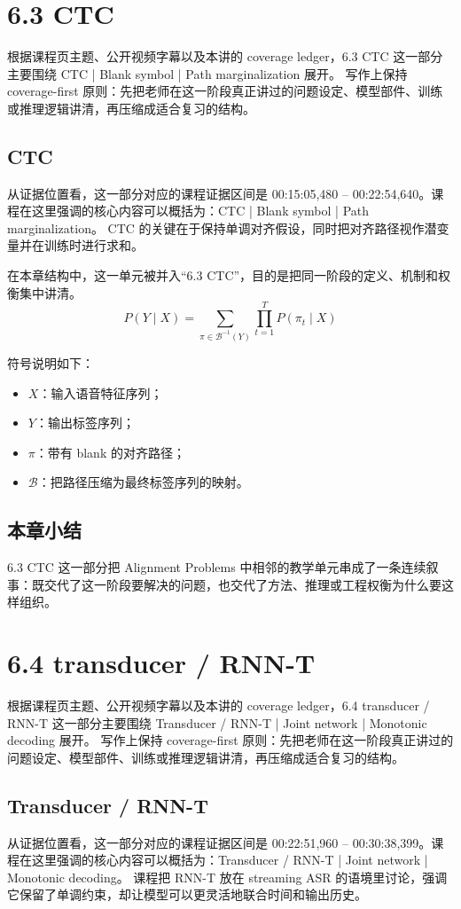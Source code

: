 \documentclass[a4paper]{article}
\begin{document}
\section{6.3 CTC}
根据课程页主题、公开视频字幕以及本讲的 coverage ledger，6.3 CTC 这一部分主要围绕 CTC | Blank symbol | Path marginalization 展开。
写作上保持 coverage-first 原则：先把老师在这一阶段真正讲过的问题设定、模型部件、训练或推理逻辑讲清，再压缩成适合复习的结构。

\subsection{CTC}
从证据位置看，这一部分对应的课程证据区间是 00:15:05,480 -- 00:22:54,640。课程在这里强调的核心内容可以概括为：CTC | Blank symbol | Path marginalization。
CTC 的关键在于保持单调对齐假设，同时把对齐路径视作潜变量并在训练时进行求和。

在本章结构中，这一单元被并入“6.3 CTC”，目的是把同一阶段的定义、机制和权衡集中讲清。
\[
P(Y \mid X) = \sum_{\pi \in \mathcal{B}^{-1}(Y)} \prod_{t=1}^{T} P(\pi_t \mid X)
\]

符号说明如下：
\begin{itemize}
\item $X$：输入语音特征序列；
\item $Y$：输出标签序列；
\item $\pi$：带有 blank 的对齐路径；
\item $\mathcal{B}$：把路径压缩为最终标签序列的映射。
\end{itemize}

\subsection{本章小结}
6.3 CTC 这一部分把 Alignment Problems 中相邻的教学单元串成了一条连续叙事：既交代了这一阶段要解决的问题，也交代了方法、推理或工程权衡为什么要这样组织。

\section{6.4 transducer / RNN-T}
根据课程页主题、公开视频字幕以及本讲的 coverage ledger，6.4 transducer / RNN-T 这一部分主要围绕 Transducer / RNN-T | Joint network | Monotonic decoding 展开。
写作上保持 coverage-first 原则：先把老师在这一阶段真正讲过的问题设定、模型部件、训练或推理逻辑讲清，再压缩成适合复习的结构。

\subsection{Transducer / RNN-T}
从证据位置看，这一部分对应的课程证据区间是 00:22:51,960 -- 00:30:38,399。课程在这里强调的核心内容可以概括为：Transducer / RNN-T | Joint network | Monotonic decoding。
课程把 RNN-T 放在 streaming ASR 的语境里讨论，强调它保留了单调约束，却让模型可以更灵活地联合时间和输出历史。
\end{document}
